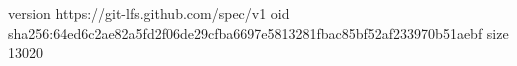 version https://git-lfs.github.com/spec/v1
oid sha256:64ed6c2ae82a5fd2f06de29cfba6697e5813281fbac85bf52af233970b51aebf
size 13020
